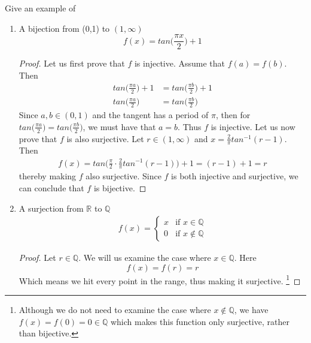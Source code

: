 \documentclass[11pt, oneside]{article}   	%
\newcommand{\R}{\mathbb R}
\newcommand{\Q}{\mathbb Q}
\begin{document}
Give an example of
\begin{enumerate}[\quad(a)]
	\item A bijection from (0,1) to $(1,\infty)$
	$$f(x) = tan\Big(\frac{\pi x}{2}\Big)+1$$
	\begin{proof}
	Let us first prove that $f$ is injective. Assume that $f(a) = f(b)$. Then
	\begin{align*}
		tan\Big(\frac{\pi a}{2}\Big)+1 & = tan\Big(\frac{\pi b}{2}\Big)+1 \\
		tan\Big(\frac{\pi a}{2}\Big) & = tan\Big(\frac{\pi b}{2}\Big) 
	\end{align*}
	Since $a, b \in (0,1)$ and the tangent has a period of $\pi$, then for $tan\Big(\frac{\pi a}{2}\Big) = tan\Big(\frac{\pi b}{2}\Big)$, we must have that $a=b$. Thus $f$ is injective. Let us now prove that $f$ is also surjective. Let $r \in (1,\infty)$ and $x = \frac{2}{\pi} tan^{-1}(r-1)$. Then
	\begin{align*}
		f(x) = tan \Big( \frac{\pi}{2} \cdot \frac{2}{\pi} tan^{-1}(r-1)\Big) +1 = (r-1) + 1 = r
	\end{align*}
	thereby making $f$ also surjective. Since $f$ is both injective and surjective, we can conclude that $f$ is bijective.
	\end{proof}
	
	\item A surjection from $\R$ to $\mathbb{Q}$
	\begin{align*}
		f(x) = \begin{cases}
				x & \text{if } x \in \mathbb{Q} \\
				0 & \text{if } x \notin \mathbb{Q}
			\end{cases}
	\end{align*}
	\begin{proof}
	Let $r \in \Q$. We will us examine the case where $x \in \Q$. Here
	$$f(x) = f(r) = r$$
	Which means we hit every point in the range, thus making it surjective. \footnote{Although we do not need to examine the case where $x \notin \Q$, we have $f(x) = f(0) = 0 \in \Q$ which makes this function only surjective, rather than bijective.}
	\end{proof}
	

\end{enumerate}
\end{document}
